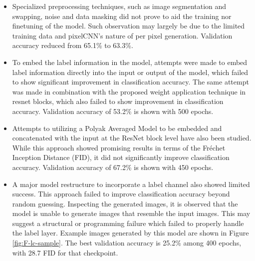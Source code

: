 \documentclass{article}
\begin{document}
\begin{itemize}
    \item Specialized preprocessing techniques, such as image segmentation and swapping, noise and data masking did not prove to aid the training nor finetuning of the model. Such observation may largely be due to the limited training data and pixelCNN's nature of per pixel generation. Validation accuracy reduced from 65.1\% to 63.3\%. 
    \item To embed the label information in the model, attempts were made to embed label information directly into the input or output of the model, which failed to show significant improvement in classification accuracy. The same attempt was made in combination with the proposed weight application technique in resnet blocks, which also failed to show improvement in classification accuracy. Validation accuracy of 53.2\% is shown with 500 epochs.
    \item Attempts to utilizing a Polyak Averaged Model to be embedded and concatenated with the input at the ResNet block level have also been studied. While this approach showed promising results in terms of the Fréchet Inception Distance (FID), it did not significantly improve classification accuracy. Validation accuracy of 67.2\% is shown with 450 epochs.
    \item A major model restructure to incorporate a label channel also showed limited success. This approach failed to improve classification accuracy beyond random guessing. Inspecting the generated images, it is observed that the model is unable to generate images that resemble the input images. This may suggest a structural or programming failure which failed to properly handle the label layer. Example images generated by this model are shown in Figure \ref{fig:F-lc-sample}. The best validation accuracy is 25.2\% among 400 epochs, with 28.7 FID for that checkpoint.
    

\end{itemize}
\end{document}
